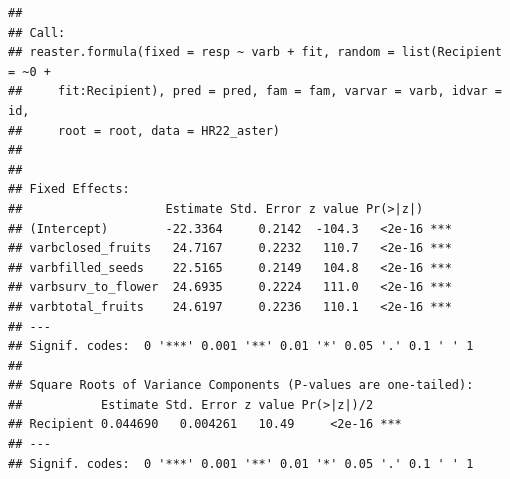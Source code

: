 \documentclass[
]{article}
\begin{document}
\begin{verbatim}
## 
## Call:
## reaster.formula(fixed = resp ~ varb + fit, random = list(Recipient = ~0 + 
##     fit:Recipient), pred = pred, fam = fam, varvar = varb, idvar = id, 
##     root = root, data = HR22_aster)
## 
## 
## Fixed Effects:
##                    Estimate Std. Error z value Pr(>|z|)    
## (Intercept)        -22.3364     0.2142  -104.3   <2e-16 ***
## varbclosed_fruits   24.7167     0.2232   110.7   <2e-16 ***
## varbfilled_seeds    22.5165     0.2149   104.8   <2e-16 ***
## varbsurv_to_flower  24.6935     0.2224   111.0   <2e-16 ***
## varbtotal_fruits    24.6197     0.2236   110.1   <2e-16 ***
## ---
## Signif. codes:  0 '***' 0.001 '**' 0.01 '*' 0.05 '.' 0.1 ' ' 1
## 
## Square Roots of Variance Components (P-values are one-tailed):
##           Estimate Std. Error z value Pr(>|z|)/2    
## Recipient 0.044690   0.004261   10.49     <2e-16 ***
## ---
## Signif. codes:  0 '***' 0.001 '**' 0.01 '*' 0.05 '.' 0.1 ' ' 1
\end{verbatim}
\end{document}
